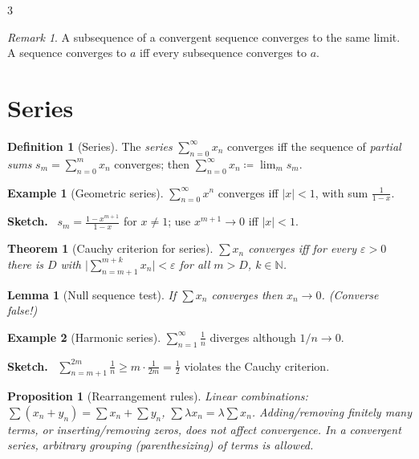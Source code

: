 \documentclass[10pt,a4paper,landscape]{article}
\theoremstyle{definition}
\newtheorem{defn}{Definition}[section]
\newtheorem{exm}{Example}[section]
\theoremstyle{plain}
\newtheorem{thm}{Theorem}[section]
\newtheorem{lem}{Lemma}[section]
\newtheorem{prop}{Proposition}[section]
\theoremstyle{remark}
\newtheorem{rem}{Remark}[section]
\newcommand{\N}{\mathbb{N}}
\newcommand{\eps}{\varepsilon}
\newcommand{\abs}[1]{\lvert #1 \rvert}
\newcommand{\oo}{\infty}
\newcommand{\deq}{\coloneqq}
\newenvironment{proofsketch}{%
  \par\small\color{exgray}\textbf{Sketch.}\ }%
  {\par}
\begin{document}
\begin{multicols*}{3}
\begin{rem}
A subsequence of a convergent sequence converges to the same limit. A sequence converges to $a$ iff every subsequence converges to $a$.
\end{rem}

\section{Series}

\begin{defn}[Series]
The \emph{series} $\sum_{n=0}^{\oo} x_n$ converges iff the sequence of \emph{partial sums} $s_m = \sum_{n=0}^{m} x_n$ converges; then $\sum_{n=0}^{\oo} x_n \deq \lim_m s_m$.
\end{defn}

\begin{exm}[Geometric series]
$\sum_{n=0}^{\oo} x^n$ converges iff $\abs{x} < 1$, with sum $\frac{1}{1-x}$.
\begin{proofsketch}
$s_m = \frac{1 - x^{m+1}}{1 - x}$ for $x \neq 1$; use $x^{m+1} \to 0$ iff $\abs{x} < 1$.
\end{proofsketch}
\end{exm}

\begin{thm}[Cauchy criterion for series]
$\sum x_n$ converges iff for every $\eps > 0$ there is $D$ with $\abs{\sum_{n=m+1}^{m+k} x_n} < \eps$ for all $m > D$, $k \in \N$.
\end{thm}

\begin{lem}[Null sequence test]
If $\sum x_n$ converges then $x_n \to 0$. (Converse false!)
\end{lem}

\begin{exm}[Harmonic series]
$\sum_{n=1}^{\oo} \frac{1}{n}$ diverges although $1/n \to 0$.
\begin{proofsketch}
$\sum_{n=m+1}^{2m} \frac{1}{n} \ge m \cdot \frac{1}{2m} = \frac{1}{2}$ violates the Cauchy criterion.
\end{proofsketch}
\end{exm}

\begin{prop}[Rearrangement rules]
Linear combinations: $\sum (x_n + y_n) = \sum x_n + \sum y_n$, $\sum \lambda x_n = \lambda \sum x_n$. Adding/removing finitely many terms, or inserting/removing zeros, does not affect convergence. In a convergent series, arbitrary grouping (parenthesizing) of terms is allowed.
\end{prop}


\end{multicols*}
\end{document}
